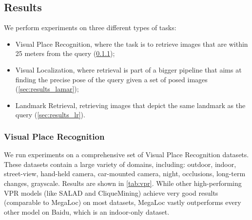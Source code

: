 \subsection{Results}
\label{sec:results}
We perform experiments on three different types of tasks:
\begin{itemize}
    \item Visual Place Recognition, where the task is to retrieve images that are within 25 meters from the query (\cref{sec:results_vpr});
    \item Visual Localization, where retrieval is part of a bigger pipeline that aims at finding the precise pose of the query given a set of posed images (\cref{sec:results_lamar});
    \item Landmark Retrieval, \ie retrieving images that depict the same landmark as the query (\cref{sec:results_lr}).
\end{itemize}

\subsubsection{Visual Place Recognition}
\label{sec:results_vpr}
We run experiments on a comprehensive set of Visual Place Recognition datasets.
These datasets contain a large variety of domains, including:
outdoor, indoor, street-view, hand-held camera, car-mounted camera, night, occlusions, long-term changes, grayscale.
Results are shown in \cref{tab:vpr}.
While other high-performing VPR models (like SALAD and CliqueMining) achieve very good results (\ie comparable to MegaLoc) on most datasets, MegaLoc vastly outperforms every other model on Baidu, which is an indoor-only dataset.

